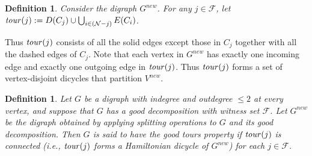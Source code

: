 \documentclass[11pt]{article}
\newtheorem{definition}[theorem]{Definition}
\newcommand{\cindset}{\mathcal{N}}
\newcommand{\fracset}{\mathcal{F}}
\begin{document}
\begin{definition}
Consider the digraph $G^{new}$.
For any $j\in \fracset$, let $\tour(j) :=
	D(C_j) \cup \bigcup_{i\in (\cindset-j)} E(C_i)$.
\end{definition}


Thus $\textit{tour\/}(j)$
consists of all the solid edges except those in $C_j$ together with
all the dashed edges of $C_j$.
Note that each vertex in $G^{new}$ has exactly one incoming edge and
exactly one outgoing edge in $\textit{tour\/}(j)$. Thus $\textit{tour\/}(j)$ forms a set of
vertex-disjoint dicycles that partition $V^{new}$.


\begin{definition}
\label{def:nicedigraph}
Let $G$ be a digraph with indegree and outdegree $\leq2$
at every vertex, and suppose that $G$ has a good decomposition
with witness set $\fracset$.
Let $G^{new}$ be the digraph obtained by applying splitting operations
to $G$ and its good decomposition.
Then $G$ is said to have the \textit{good tours} property if
$\textit{tour\/}(j)$ is connected
(i.e., $\textit{tour\/}(j)$ forms a Hamiltonian dicycle of $G^{new}$)
for each $j\in\fracset$.
\end{definition}
\end{document}
